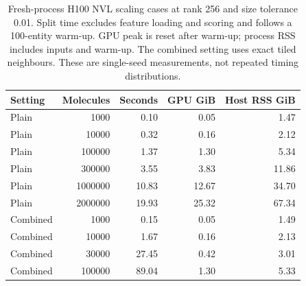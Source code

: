 \begin{table}[htbp]\centering\small
\begin{tabular}{lrrrr}
\toprule
Setting & Molecules & Seconds & GPU GiB & Host RSS GiB \\
\midrule
Plain & 1000 & 0.10 & 0.05 & 1.47 \\
Plain & 10000 & 0.32 & 0.16 & 2.12 \\
Plain & 100000 & 1.37 & 1.30 & 5.34 \\
Plain & 300000 & 3.55 & 3.83 & 11.86 \\
Plain & 1000000 & 10.83 & 12.67 & 34.70 \\
Plain & 2000000 & 19.93 & 25.32 & 67.34 \\
Combined & 1000 & 0.15 & 0.05 & 1.49 \\
Combined & 10000 & 1.67 & 0.16 & 2.13 \\
Combined & 30000 & 27.45 & 0.42 & 3.01 \\
Combined & 100000 & 89.04 & 1.30 & 5.33 \\
\bottomrule
\end{tabular}
\caption{Fresh-process H100 NVL scaling cases at rank 256 and size tolerance 0.01. Split time excludes feature loading and scoring and follows a 100-entity warm-up. GPU peak is reset after warm-up; process RSS includes inputs and warm-up. The combined setting uses exact tiled neighbours. These are single-seed measurements, not repeated timing distributions.}\end{table}

